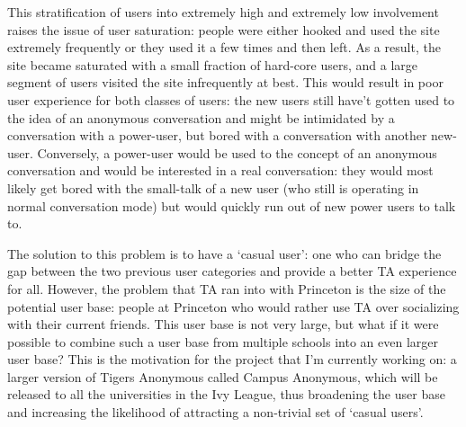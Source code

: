 This stratification of users into extremely high and extremely low involvement raises the issue of user saturation: people were either hooked and used the site extremely frequently or they used it a few times and then left. As a result, the site became saturated with a small fraction of hard-core users, and a large segment of users visited the site infrequently at best. This would result in poor user experience for both classes of users: the new users still have't gotten used to the idea of an anonymous conversation and might be intimidated by a conversation with a power-user, but bored with a conversation with another new-user. Conversely, a power-user would be used to the concept of an anonymous conversation and would be interested in a real conversation: they would most likely get bored with the small-talk of a new user (who still is operating in normal conversation mode) but would quickly run out of new power users to talk to. 

The solution to this problem is to have a `casual user': one who can bridge the gap between the two previous user categories and provide a better TA experience for all. However, the problem that TA ran into with Princeton is the size of the potential user base: people at Princeton who would rather use TA over socializing with their current friends. This user base is not very large, but what if it were possible to combine such a user base from multiple schools into an even larger user base? This is the motivation for the project that I'm currently working on: a larger version of Tigers Anonymous called Campus Anonymous, which will be released to all the universities in the Ivy League, thus broadening the user base and increasing the likelihood of attracting a non-trivial set of `casual users'.
